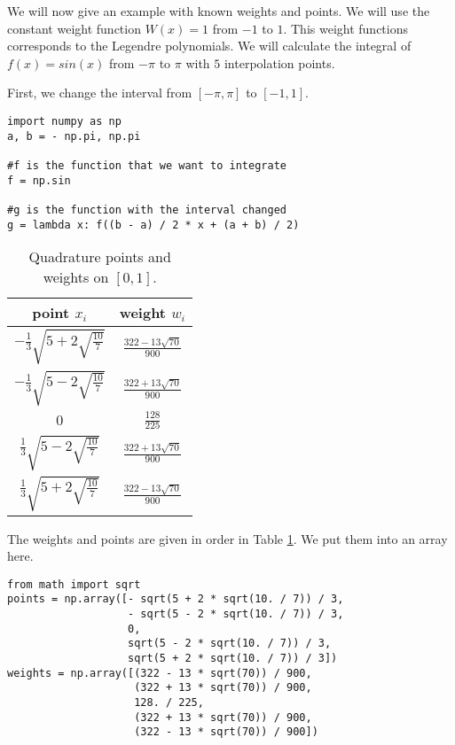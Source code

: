 We will now give an example with known weights and points.
We will use the constant weight function $W(x) = 1$ from $-1$ to $1$.
This weight functions corresponds to the Legendre polynomials.
We will calculate the integral of $f(x) = sin(x)$ from $-\pi$ to $\pi$ with $5$ interpolation points.

First, we change the interval from $[-\pi, \pi]$ to $[-1,1]$.

\begin{lstlisting}
import numpy as np
a, b = - np.pi, np.pi

#f is the function that we want to integrate
f = np.sin

#g is the function with the interval changed
g = lambda x: f((b - a) / 2 * x + (a + b) / 2)
\end{lstlisting}

\begin{table}[h!]
\begin{center}
\begin{tabular}{|c|c|}
\hline
point $x_i$ & weight $w_i$ \\
\hline
$-\frac{1}{3}\sqrt{5 + 2\sqrt{\frac{10}{7}}}$ &  $\frac{322-13\sqrt{70}}{900}$ \\
\hline
$-\frac{1}{3}\sqrt{5 - 2\sqrt{\frac{10}{7}}}$ & $\frac{322+13\sqrt{70}}{900}$ \\
\hline
$0$ & $\frac{128}{225}$ \\
\hline
$\frac{1}{3}\sqrt{5 - 2\sqrt{\frac{10}{7}}}$ & $\frac{322+13\sqrt{70}}{900}$ \\
\hline
$\frac{1}{3}\sqrt{5 + 2\sqrt{\frac{10}{7}}}$ & $\frac{322-13\sqrt{70}}{900}$ \\
\hline
\end{tabular}
\end{center}
\caption{Quadrature points and weights on $\left[0, 1\right]$.}
\label{intro_table}
\end{table}

The weights and points are given in order in Table \ref{intro_table}.
We put them into an array here.

\begin{lstlisting}
from math import sqrt
points = np.array([- sqrt(5 + 2 * sqrt(10. / 7)) / 3,
                   - sqrt(5 - 2 * sqrt(10. / 7)) / 3,
                   0,
                   sqrt(5 - 2 * sqrt(10. / 7)) / 3,
                   sqrt(5 + 2 * sqrt(10. / 7)) / 3])
weights = np.array([(322 - 13 * sqrt(70)) / 900,
                    (322 + 13 * sqrt(70)) / 900,
                    128. / 225,
                    (322 + 13 * sqrt(70)) / 900,
                    (322 - 13 * sqrt(70)) / 900])
\end{lstlisting}

